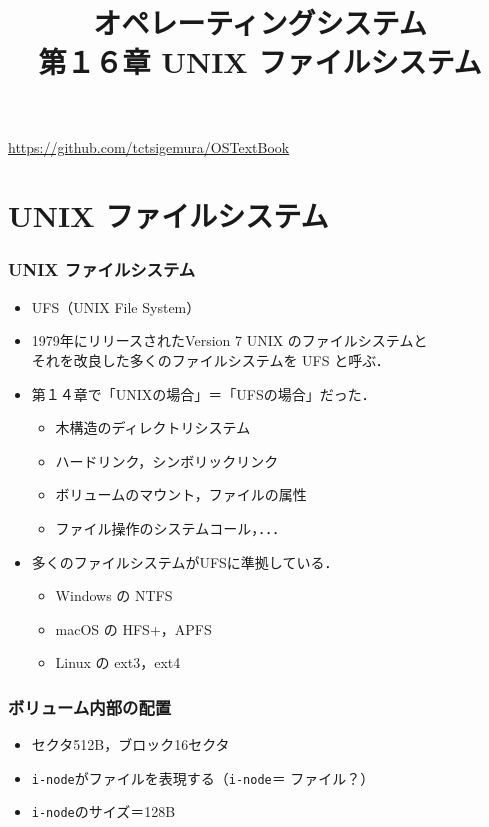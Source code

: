 \documentclass[unicode,handout]{beamer}                   %
\newcommand{\inode}{\texttt{i-node}}
\begin{document}
\title[UNIX ファイルシステム]
      {オペレーティングシステム\\第１６章 UNIX ファイルシステム}
\date{}
\begin{frame}
  \titlepage
  \centerline{\url{https://github.com/tctsigemura/OSTextBook}}
\end{frame}


\section{UNIX ファイルシステム}
\begin{frame}
  \frametitle{UNIX ファイルシステム}
  \begin{itemize}
  \item UFS（UNIX File System）
  \item 1979年にリリースされたVersion 7 UNIX のファイルシステムと \\
    それを改良した多くのファイルシステムを UFS と呼ぶ．
  \item 第１４章で「UNIXの場合」＝「UFSの場合」だった．
    \begin{itemize}
    \item 木構造のディレクトリシステム
    \item ハードリンク，シンボリックリンク
    \item ボリュームのマウント，ファイルの属性
    \item ファイル操作のシステムコール，．．．
    \end{itemize}
  \item 多くのファイルシステムがUFSに準拠している．
    \begin{itemize}
    \item Windows の NTFS
    \item macOS の HFS+，APFS
    \item Linux の ext3，ext4
    \end{itemize}
  \end{itemize}
  \vfill
\end{frame}

\begin{frame}
  \frametitle{ボリューム内部の配置}
  \begin{itemize}
  \item セクタ512B，ブロック16セクタ
  \item \inode がファイルを表現する（\inode ＝ ファイル？）
  \item \inode のサイズ＝128B
  \end{itemize}
  \vfill
\end{frame}
\end{document}
